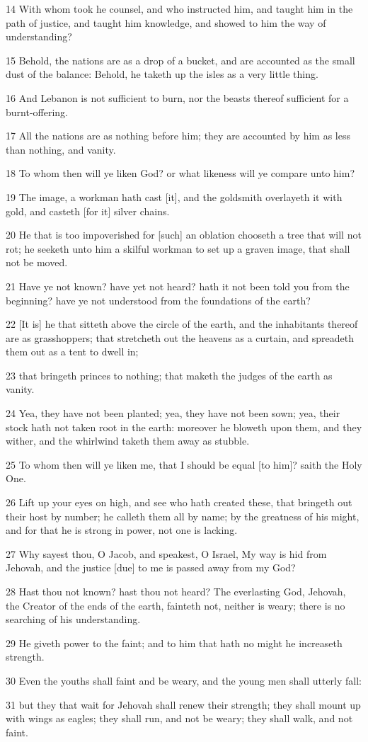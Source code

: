 \par 14 With whom took he counsel, and who instructed him, and taught him in the path of justice, and taught him knowledge, and showed to him the way of understanding?
\par 15 Behold, the nations are as a drop of a bucket, and are accounted as the small dust of the balance: Behold, he taketh up the isles as a very little thing.
\par 16 And Lebanon is not sufficient to burn, nor the beasts thereof sufficient for a burnt-offering.
\par 17 All the nations are as nothing before him; they are accounted by him as less than nothing, and vanity.
\par 18 To whom then will ye liken God? or what likeness will ye compare unto him?
\par 19 The image, a workman hath cast [it], and the goldsmith overlayeth it with gold, and casteth [for it] silver chains.
\par 20 He that is too impoverished for [such] an oblation chooseth a tree that will not rot; he seeketh unto him a skilful workman to set up a graven image, that shall not be moved.
\par 21 Have ye not known? have yet not heard? hath it not been told you from the beginning? have ye not understood from the foundations of the earth?
\par 22 [It is] he that sitteth above the circle of the earth, and the inhabitants thereof are as grasshoppers; that stretcheth out the heavens as a curtain, and spreadeth them out as a tent to dwell in;
\par 23 that bringeth princes to nothing; that maketh the judges of the earth as vanity.
\par 24 Yea, they have not been planted; yea, they have not been sown; yea, their stock hath not taken root in the earth: moreover he bloweth upon them, and they wither, and the whirlwind taketh them away as stubble.
\par 25 To whom then will ye liken me, that I should be equal [to him]? saith the Holy One.
\par 26 Lift up your eyes on high, and see who hath created these, that bringeth out their host by number; he calleth them all by name; by the greatness of his might, and for that he is strong in power, not one is lacking.
\par 27 Why sayest thou, O Jacob, and speakest, O Israel, My way is hid from Jehovah, and the justice [due] to me is passed away from my God?
\par 28 Hast thou not known? hast thou not heard? The everlasting God, Jehovah, the Creator of the ends of the earth, fainteth not, neither is weary; there is no searching of his understanding.
\par 29 He giveth power to the faint; and to him that hath no might he increaseth strength.
\par 30 Even the youths shall faint and be weary, and the young men shall utterly fall:
\par 31 but they that wait for Jehovah shall renew their strength; they shall mount up with wings as eagles; they shall run, and not be weary; they shall walk, and not faint.

